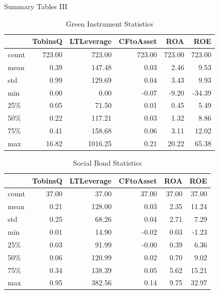 \documentclass[
	8pt, %
]{beamer}
\begin{document}
\begin{frame}{Summary Tables III}
 \begin{table}[h]
\centering
\caption{Green Instrument Statistics}
\begin{tabular}{lrrrrr}
\hline
 & TobinsQ & LTLeverage & CFtoAsset & ROA & ROE \\
\hline
count & 723.00 & 723.00 & 723.00 & 723.00 & 723.00 \\
mean & 0.39 & 147.48 & 0.03 & 2.46 & 9.53 \\
std & 0.99 & 129.69 & 0.04 & 3.43 & 9.93 \\
min & 0.00 & 0.00 & -0.07 & -9.20 & -34.39 \\
25\% & 0.05 & 71.50 & 0.01 & 0.45 & 5.49 \\
50\% & 0.22 & 117.21 & 0.03 & 1.32 & 8.86 \\
75\% & 0.41 & 158.68 & 0.06 & 3.11 & 12.02 \\
max & 16.82 & 1016.25 & 0.21 & 20.22 & 65.38 \\
\hline
\end{tabular}
\label{table:4}
\end{table}

\begin{table}[h]
\centering
\caption{Social Bond Statistics}
\begin{tabular}{lrrrrr}
\hline
 & TobinsQ & LTLeverage & CFtoAsset & ROA & ROE \\
\hline
count & 37.00 & 37.00 & 37.00 & 37.00 & 37.00 \\
mean & 0.21 & 128.00 & 0.03 & 2.35 & 11.24 \\
std & 0.25 & 68.26 & 0.04 & 2.71 & 7.29 \\
min & 0.01 & 14.90 & -0.02 & 0.03 & -1.23 \\
25\% & 0.03 & 91.99 & -0.00 & 0.39 & 6.36 \\
50\% & 0.06 & 120.99 & 0.02 & 0.70 & 9.02 \\
75\% & 0.34 & 138.39 & 0.05 & 5.62 & 15.21 \\
max & 0.95 & 382.56 & 0.14 & 9.75 & 32.97 \\
\hline
\end{tabular}
\label{table:5}
\end{table}
 
\end{frame}
\end{document}
